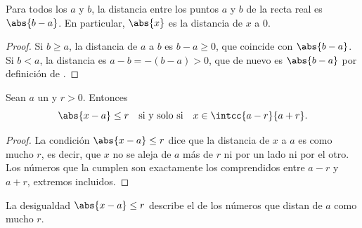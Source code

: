 \begin{proposition}\label{prop:g10:numbers:distance}
Para todos los  $a$ y $b$, la distancia entre los puntos $a$
y $b$ de la recta real es $\abs{b - a}$. En particular, $\abs{x}$ es la
distancia de $x$ a $0$.
\end{proposition}

\begin{proof}
Si $b \geq a$, la distancia de $a$ a $b$ es $b - a \geq 0$, que coincide
con $\abs{b-a}$. Si $b < a$, la distancia es $a - b = -(b - a) > 0$, que de
nuevo es $\abs{b - a}$ por definición de .
\end{proof}

\begin{proposition}\label{prop:g10:numbers:absinterval}
Sean $a$ un  y $r > 0$. Entonces
\[
\abs{x - a} \leq r
\quad\text{si y solo si}\quad
x \in \intcc{a - r}{a + r}.
\]
\end{proposition}

\begin{proof}
La condición $\abs{x-a} \leq r$ dice que la distancia de $x$ a $a$ es como
mucho $r$, es decir, que $x$ no se aleja de $a$ más de $r$ ni por un lado
ni por el otro. Los números que la cumplen son exactamente los
comprendidos entre $a - r$ y $a + r$, extremos incluidos.
\end{proof}

\begin{omfigure}

{\small La desigualdad $\abs{x - a} \leq r$ describe el  de los
números que distan de $a$ como mucho $r$.}
\end{omfigure}


